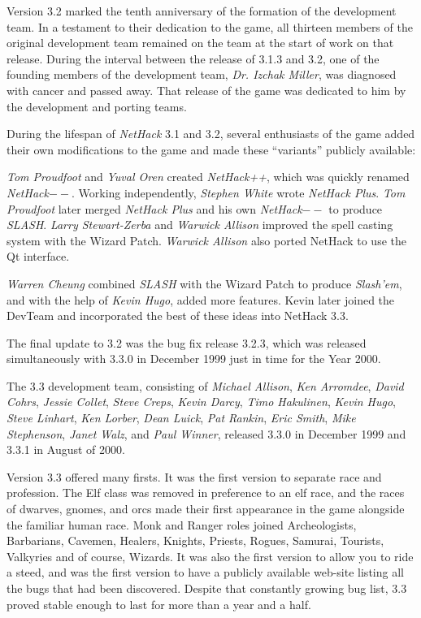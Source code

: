 \medskip
\nd Version 3.2 marked the tenth anniversary of the formation of the development
team.  In a testament to their dedication to the game, all thirteen members
of the original development team remained on the team at the start of work on
that release.  During the interval between the release of 3.1.3 and 3.2,
one of the founding members of the development team, {\it Dr. Izchak Miller},
was diagnosed with cancer and passed away.  That release of the game was
dedicated to him by the development and porting teams.

\medskip
During the lifespan of {\it NetHack\/} 3.1 and 3.2, several enthusiasts
of the game added
their own modifications to the game and made these ``variants'' publicly
available:

\medskip
{\it Tom Proudfoot} and {\it Yuval Oren} created {\it NetHack++},
which was quickly renamed {\it NetHack$--$}.
Working independently, {\it Stephen White} wrote {\it NetHack Plus}.
{\it Tom Proudfoot} later merged {\it NetHack Plus}
and his own {\it NetHack$--$} to produce {\it SLASH}.
{\it Larry Stewart-Zerba} and {\it Warwick Allison} improved the spell
casting system with the Wizard Patch.
{\it Warwick Allison} also ported NetHack to use the Qt interface.

\medskip
{\it Warren Cheung} combined {\it SLASH} with the Wizard Patch
to produce {\it Slash'em\/}, and
with the help of {\it Kevin Hugo}, added more features.
Kevin later joined the
DevTeam and incorporated the best of these ideas into NetHack 3.3.

\medskip
The final update to 3.2 was the bug fix release 3.2.3, which was released
simultaneously with 3.3.0 in December 1999 just in time for the Year 2000.

\medskip
The 3.3 development team, consisting of {\it Michael Allison}, {\it Ken Arromdee}, 
{\it David Cohrs}, {\it Jessie Collet}, {\it Steve Creps}, {\it Kevin Darcy}, 
{\it Timo Hakulinen}, {\it Kevin Hugo}, {\it Steve Linhart}, {\it Ken Lorber}, 
{\it Dean Luick}, {\it Pat Rankin}, {\it Eric Smith}, {\it Mike Stephenson}, 
{\it Janet Walz}, and {\it Paul Winner}, released 3.3.0 in 
December 1999 and 3.3.1 in August of 2000.

\medskip
Version 3.3 offered many firsts. It was the first version to separate race 
and profession. The Elf class was removed in preference to an elf race, 
and the races of dwarves, gnomes, and orcs made their first appearance in 
the game alongside the familiar human race.  Monk and Ranger roles joined 
Archeologists, Barbarians, Cavemen, Healers, Knights, Priests, Rogues, Samurai, 
Tourists, Valkyries and of course, Wizards.  It was also the first version
to allow you to ride a steed, and was the first version to have a publicly 
available web-site listing all the bugs that had been discovered.  Despite 
that constantly growing bug list, 3.3 proved stable enough to last for
more than a year and a half.

